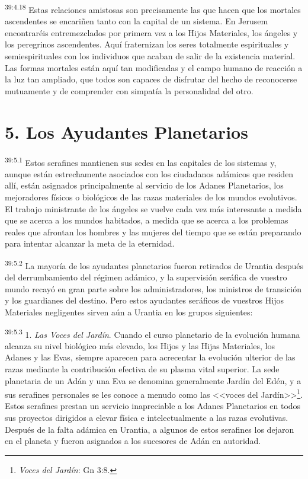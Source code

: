 \par
\textsuperscript{39:4.18} Estas relaciones amistosas son precisamente las que hacen que los mortales ascendentes se encariñen tanto con la capital de un sistema. En Jerusem encontraréis entremezclados por primera vez a los Hijos Materiales, los ángeles y los peregrinos ascendentes. Aquí fraternizan los seres totalmente espirituales y semiespirituales con los individuos que acaban de salir de la existencia material. Las formas mortales están aquí tan modificadas y el campo humano de reacción a la luz tan ampliado, que todos son capaces de disfrutar del hecho de reconocerse mutuamente y de comprender con simpatía la personalidad del otro.

\section*{5. Los Ayudantes Planetarios}
\par
\textsuperscript{39:5.1} Estos serafines mantienen sus sedes en las capitales de los sistemas y, aunque están estrechamente asociados con los ciudadanos adámicos que residen allí, están asignados principalmente al servicio de los Adanes Planetarios, los mejoradores físicos o biológicos de las razas materiales de los mundos evolutivos. El trabajo ministrante de los ángeles se vuelve cada vez más interesante a medida que se acerca a los mundos habitados, a medida que se acerca a los problemas reales que afrontan los hombres y las mujeres del tiempo que se están preparando para intentar alcanzar la meta de la eternidad.

\par
\textsuperscript{39:5.2} La mayoría de los ayudantes planetarios fueron retirados de Urantia después del derrumbamiento del régimen adámico, y la supervisión seráfica de vuestro mundo recayó en gran parte sobre los administradores, los ministros de transición y los guardianes del destino. Pero estos ayudantes seráficos de vuestros Hijos Materiales negligentes sirven aún a Urantia en los grupos siguientes:

\par
\textsuperscript{39:5.3} 1. \textit{Las Voces del Jardín}. Cuando el curso planetario de la evolución humana alcanza su nivel biológico más elevado, los Hijos y las Hijas Materiales, los Adanes y las Evas, siempre aparecen para acrecentar la evolución ulterior de las razas mediante la contribución efectiva de su plasma vital superior. La sede planetaria de un Adán y una Eva se denomina generalmente Jardín del Edén, y a sus serafines personales se les conoce a menudo como las <<voces del Jardín>>\footnote{\textit{Voces del Jardín}: Gn 3:8.}. Estos serafines prestan un servicio inapreciable a los Adanes Planetarios en todos sus proyectos dirigidos a elevar física e intelectualmente a las razas evolutivas. Después de la falta adámica en Urantia, a algunos de estos serafines los dejaron en el planeta y fueron asignados a los sucesores de Adán en autoridad.

